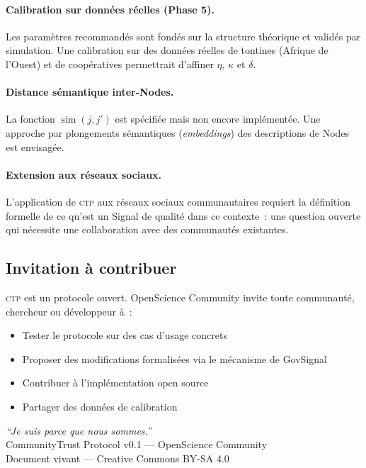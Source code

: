 \documentclass[12pt,a4paper]{article}
\theoremstyle{definition}
\theoremstyle{plain}
\theoremstyle{remark}
\newcommand{\CTP}{\textsc{ctp}}
\newcommand{\1}{\mathbf{1}}
\begin{document}
\paragraph{Calibration sur données réelles (Phase 5).}
Les paramètres recommandés sont fondés sur la structure théorique et validés
par simulation. Une calibration sur des données réelles de tontines (Afrique
de l'Ouest) et de coopératives permettrait d'affiner $\eta$, $\kappa$ et
$\delta$.

\paragraph{Distance sémantique inter-Nodes.}
La fonction $\operatorname{sim}(j, j')$ est spécifiée mais non encore
implémentée. Une approche par plongements sémantiques (\textit{embeddings}) des
descriptions de Nodes est envisagée.

\paragraph{Extension aux réseaux sociaux.}
L'application de \CTP{} aux réseaux sociaux communautaires requiert la
définition formelle de ce qu'est un Signal de qualité dans ce contexte~:
une question ouverte qui nécessite une collaboration avec des communautés
existantes.

\subsection{Invitation à contribuer}

\CTP{} est un protocole ouvert. OpenScience Community invite toute
communauté, chercheur ou développeur à~:

\begin{itemize}
  \item Tester le protocole sur des cas d'usage concrets
  \item Proposer des modifications formalisées via le mécanisme de GovSignal
  \item Contribuer à l'implémentation open source
  \item Partager des données de calibration
\end{itemize}

\medskip
\begin{center}
\textit{``Je suis parce que nous sommes.''}\\
\medskip
{\small CommunityTrust Protocol v0.1 --- OpenScience Community\\
Document vivant --- Creative Commons BY-SA 4.0}
\end{center}
\end{document}
